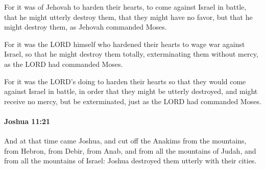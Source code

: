 			\begin{versebox}
					\item[BHS] 
					\item[ASV] For it was of Jehovah to harden their hearts, to come against Israel in battle, that he might utterly destroy them, that they might have no favor, but that he might destroy them, as Jehovah commanded Moses.
					\item[NIV] For it was the LORD himself who hardened their hearts to wage war against Israel, so that he might destroy them totally, exterminating them without mercy, as the LORD had commanded Moses.
					\item[NRSV] For it was the LORD’s doing to harden their hearts so that they would come against Israel in battle, in order that they might be utterly destroyed, and might receive no mercy, but be exterminated, just as the LORD had commanded Moses.
			\end{versebox}

		\paragraph{Joshua 11:21} %
			\label{JOSHUA-11-21}

			And at that time came Joshua, and cut off the Anakims from the mountains, from Hebron, from Debir, from Anab, and from all the mountains of Judah, and from all the mountains of Israel: Joshua destroyed them utterly with their cities.

